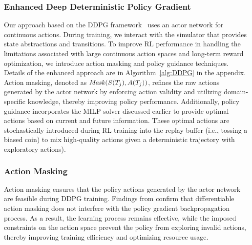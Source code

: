 %
\subsubsection{Enhanced Deep Deterministic Policy Gradient}
Our approach based on the DDPG framework~\cite{lillicrap2015continuous} uses an actor network for continuous actions.
During training, we interact with the simulator that provides state abstractions and transitions.
To improve RL performance in handling the limitations associated with large continuous action spaces and long-term reward optimization, we introduce action masking and policy guidance techniques. Details of the enhanced approach are in Algorithm~\ref{alg:DDPG} in the appendix. 
Action masking, denoted as ${\it Mask}(S(T_j), A(T_j))$, refines the raw actions generated by the actor network by enforcing action validity and utilizing domain-specific knowledge, thereby improving policy performance. Additionally, policy guidance incorporates the MILP solver discussed earlier to provide optimal actions based on current and future information. These optimal actions are stochastically introduced during RL training into the replay buffer (i.e., tossing a biased coin) to mix high-quality actions given a deterministic trajectory with exploratory actions).  


\subsubsection{Action Masking}
Action masking ensures that the policy actions generated by the actor network are feasible during DDPG training. Findings from \cite{huang2020closer,kanervisto2020action} confirm that differentiable action masking does not interfere with the policy gradient backpropagation process. As a result, the learning process remains effective, while the imposed constraints on the action space prevent the policy from exploring invalid actions, thereby improving training efficiency and optimizing resource usage. 


